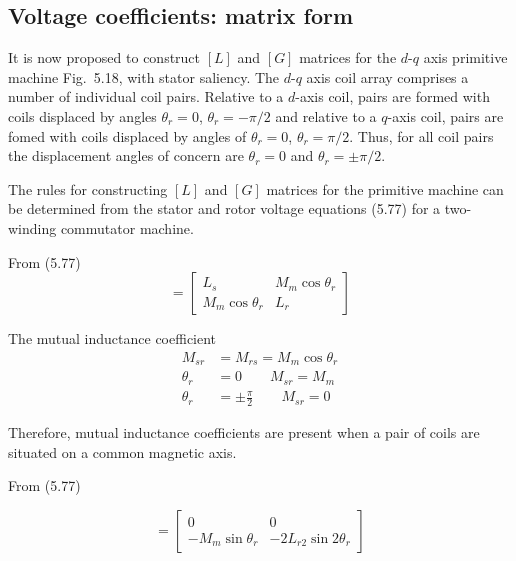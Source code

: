 \documentclass[a4paper,numbers=noenddot,12pt]{scrbook}
\begin{document}
        \subsection{Voltage coefficients: matrix form} 
        It is now proposed to construct $[L]$ and $[G]$ matrices for the $d$-$q$ axis primitive machine Fig.\ 5.18, with stator saliency. The $d$-$q$ axis coil array comprises a number of individual coil pairs. Relative to a $d$-axis coil, pairs are formed with coils displaced by angles $\theta_r = 0$, $\theta_r = -\pi/2$ and relative to a $q$-axis coil, pairs are fomed with coils displaced by angles of $\theta_r = 0$, $\theta_r = \pi/2$. Thus, for all coil pairs the displacement angles of concern are $\theta_r = 0$ and $\theta_r = \pm \pi / 2$.

        The rules for constructing $[L]$ and $[G]$ matrices for the primitive machine can be determined from the stator and rotor voltage equations (5.77) for a two-winding commutator machine.

        From (5.77)
        \begin{equation*}
            [L] =
            \begin{bmatrix}
                L_s & M_m \cos \theta_r \\
                M_m \cos \theta_r & L_r
            \end{bmatrix}
        \end{equation*}

        The mutual inductance coefficient
        \begin{align}
            M_{sr} & = M_{rs} = M_m \cos \theta_r \\
            \theta_r & = 0  \qquad M_{sr} = M_m \nonumber \\
            \theta_r & = \pm \frac{\pi}{2} \qquad M_{sr} = 0 \nonumber
        \end{align}

        Therefore, mutual inductance coefficients are present when a pair of coils are situated on a common magnetic axis.

        From (5.77)

        \begin{equation*}
            [G] = 
            \begin{bmatrix}
                0 & 0 \\ 
                -M_m \sin \theta_r & -2 L_{r2} \sin 2 \theta_r
            \end{bmatrix}
        \end{equation*}
\end{document}
